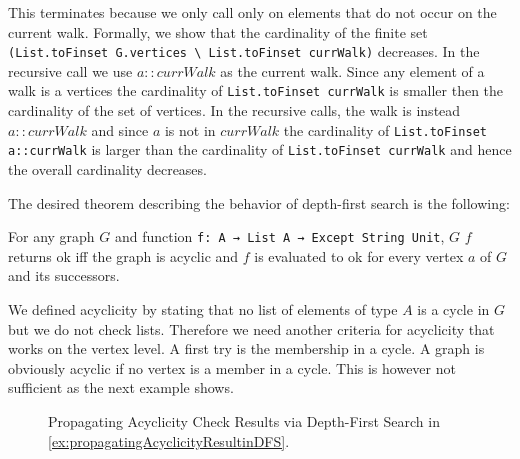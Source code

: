 This terminates because we only call \dfsstep only on elements that do not occur on the current walk. Formally, we show that the cardinality of the finite set \lstinline|(List.toFinset G.vertices \ List.toFinset currWalk)| decreases. In the recursive call we use $a::currWalk$ as the current walk. Since any element of a walk is a vertices the cardinality of \lstinline|List.toFinset currWalk| is smaller then the cardinality of the set of vertices. In the recursive calls, the walk is instead $a::currWalk$ and since $a$ is not in $currWalk$ the cardinality of \lstinline|List.toFinset a::currWalk| is larger than the cardinality of \lstinline|List.toFinset currWalk| and hence the overall cardinality decreases.

The desired theorem describing the behavior of depth-first search is the following:

\begin{theorem}[\dfssemantics]
    For any graph $G$ and function \lstinline|f: A → List A → Except String Unit|, \dfs $G$ $f$ returns ok iff the graph is acyclic and $f$ is evaluated to ok for every vertex $a$ of $G$ and its successors.
\end{theorem}

We defined acyclicity by stating that no list of elements of type $A$ is a cycle in $G$ but we do not check lists. Therefore we need another criteria for acyclicity that works on the vertex level. A first try is the membership in a cycle. A graph is obviously acyclic if no vertex is a member in a cycle. This is however not sufficient as the next example shows.


\begin{figure}
  \center
  \caption{Propagating Acyclicity Check Results via Depth-First Search in \cref{ex:propagatingAcyclicityResultinDFS}.}\label{fig:propagatingAcyclicityResultinDFS}
\end{figure}

